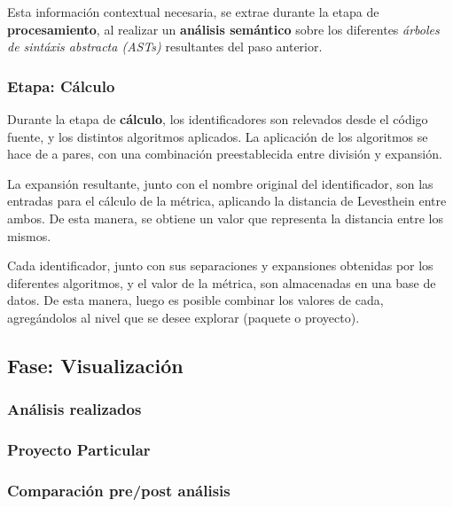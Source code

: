 Esta información contextual necesaria, se extrae durante la etapa de \textbf{procesamiento},
al realizar un \textbf{análisis semántico} sobre los diferentes \textit{árboles de sintáxis abstracta (ASTs)} 
resultantes del paso anterior.

\subsubsection{Etapa: Cálculo}

Durante la etapa de \textbf{cálculo}, los identificadores son relevados desde el código fuente,
y los distintos algoritmos aplicados.
La aplicación de los algoritmos se hace de a pares, con una combinación preestablecida
entre división y expansión.

La expansión resultante, junto con el nombre original del identificador, son las
entradas para el cálculo de la métrica, aplicando la distancia de Levesthein
entre ambos.
De esta manera, se obtiene un valor que representa la distancia entre los mismos.

Cada identificador, junto con sus separaciones y expansiones obtenidas por los diferentes
algoritmos, y el valor de la métrica, son almacenadas en una base de datos.
De esta manera, luego es posible combinar los valores de cada, agregándolos al nivel
que se desee explorar (paquete o proyecto).

\subsection{Fase: Visualización}

\subsubsection{Análisis realizados}
\subsubsection{Proyecto Particular}
\subsubsection{Comparación pre/post análisis}
